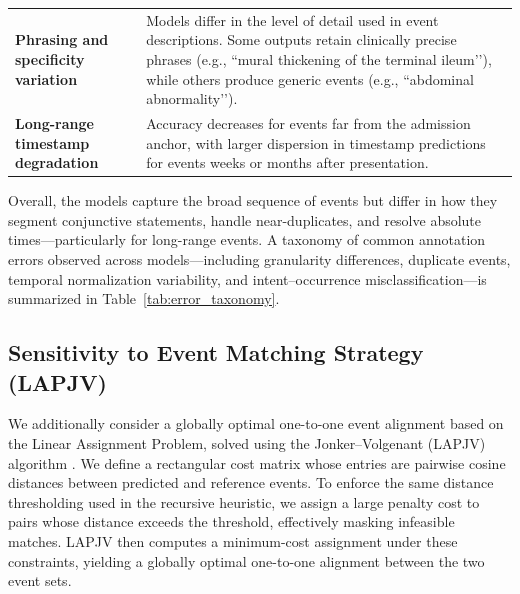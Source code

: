\documentclass[pdflatex,sn-mathphys-num]{sn-jnl}%
\theoremstyle{thmstyleone}%
\theoremstyle{thmstyletwo}%
\theoremstyle{thmstylethree}%
\begin{document}
\begin{table}[h!]
\begin{tabular}{p{3.2cm} p{9cm}}
\textbf{Phrasing and specificity variation} 
& Models differ in the level of detail used in event descriptions.  
Some outputs retain clinically precise phrases (e.g., ``mural thickening of the terminal ileum’’), while others produce generic events (e.g., ``abdominal abnormality’’). \\[6pt]

\textbf{Long-range timestamp degradation} 
& Accuracy decreases for events far from the admission anchor, with larger dispersion in timestamp predictions for events weeks or months after presentation. \\
\bottomrule
\end{tabular}
\vspace{-5mm}
\end{table}

Overall, the models capture the broad sequence of events but differ in how they segment conjunctive statements, handle near-duplicates, and resolve absolute times—particularly for
long-range events. A taxonomy of common annotation errors observed across models—including granularity differences, duplicate events, temporal normalization variability, and intent–occurrence misclassification—is summarized in Table~\ref{tab:error_taxonomy}.


\subsection{Sensitivity to Event Matching Strategy (LAPJV)}
\label{apd:lapjv-matching}
We additionally consider a globally optimal one-to-one event alignment based on the Linear Assignment Problem, solved using the Jonker--Volgenant (LAPJV) algorithm \citep{jonker1987shortest}. We define a rectangular cost matrix whose entries are pairwise cosine distances between predicted and reference events. To enforce the same distance thresholding used in the recursive heuristic, we assign a large penalty cost to pairs whose distance exceeds the threshold, effectively masking infeasible matches. LAPJV then computes a minimum-cost assignment under these constraints, yielding a globally optimal one-to-one alignment between the two event sets.
\end{document}
